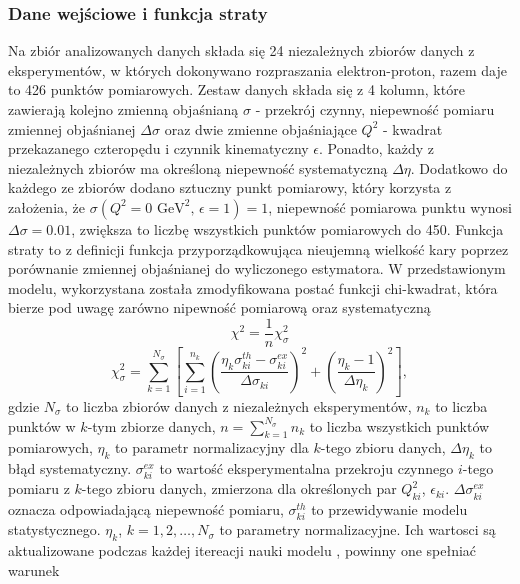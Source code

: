 \documentclass[11pt]{book}
\theoremstyle{definition}
\begin{document}
\subsubsection{Dane wejściowe i funkcja straty}
%
%
Na zbiór analizowanych danych składa się 24 niezależnych zbiorów danych z eksperymentów, w których dokonywano rozpraszania elektron-proton, razem daje to 426 punktów pomiarowych. Zestaw danych składa się z 4 kolumn, które zawierają kolejno zmienną objaśnianą $\sigma$ - przekrój czynny, niepewność pomiaru zmiennej objaśnianej $\Delta \sigma$ oraz dwie zmienne objaśniające $Q^2$ - kwadrat przekazanego czteropędu i czynnik kinematyczny $\epsilon$. Ponadto, każdy z niezależnych zbiorów ma określoną niepewność systematyczną $\Delta \eta$.  Dodatkowo do każdego ze zbiorów dodano sztuczny punkt pomiarowy, który korzysta z założenia, że $\sigma \left(Q^2 = 0 \text{ GeV}^2, \, \epsilon = 1 \right) = 1$, niepewność pomiarowa punktu wynosi $\Delta \sigma = 0.01$, zwiększa to liczbę wszystkich punktów pomiarowych do 450.
%
%
%
Funkcja straty to z definicji funkcja przyporządkowująca nieujemną wielkość kary poprzez porównanie zmiennej objaśnianej do wyliczonego estymatora. W przedstawionym modelu, wykorzystana została zmodyfikowana postać funkcji chi-kwadrat, która bierze pod uwagę zarówno nipewność pomiarową oraz systematyczną
%
\begin{equation}
\chi^2 = \frac{1}{n} \chi_{\sigma}^2
\end{equation}
%
\begin{equation}
\chi_{\sigma}^2 = \sum_{k=1}^{N_{\sigma}} \left[ \sum_{i=1}^{n_k} \left( \frac{\eta_k \sigma^{th}_{ki} - \sigma^{ex}_{ki}}{\Delta \sigma_{ki}} \right)^2 + \left(\frac{\eta_k - 1}{\Delta \eta_k}\right)^2 \right],
\end{equation}
%
gdzie $N_{\sigma}$ to liczba zbiorów danych z niezależnych eksperymentów, $n_k$ to liczba punktów w $k$-tym zbiorze danych, $n = \sum_{k=1}^{N_{\sigma}}n_k$ to liczba wszystkich punktów pomiarowych, $\eta_k$ to parametr normalizacyjny dla $k$-tego zbioru danych, $\Delta \eta_k$ to błąd systematyczny. $\sigma^{ex}_{ki}$ to wartość eksperymentalna przekroju czynnego $i$-tego pomiaru z $k$-tego zbioru danych, zmierzona dla określonych par $Q^2_{ki}$, $\epsilon_{ki}$. $\Delta \sigma_{ki}^{ex}$ oznacza odpowiadającą niepewność pomiaru, $\sigma_{ki}^{th}$ to przewidywanie modelu statystycznego. $\eta_k$, $k =1,2,\dots, N_{\sigma}$ to parametry normalizacyjne. Ich wartosci są aktualizowane podczas każdej itereacji nauki modelu \cite{PhysRevC.84.034314}, powinny one spełniać warunek
\end{document}
